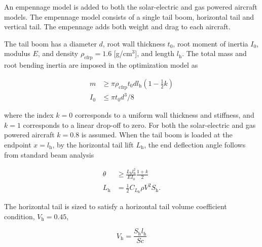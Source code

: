 An empennage model is added to both the solar-electric and gas powered aircraft models.  The empennage model consists of a single tail boom, horizontal tail and vertical tail.  
The empennage adds both weight and drag to each aircraft.  

The tail boom has a diameter $d$, root wall thickness $t_0$, root moment of inertia $I_0$, modulus $E$, and density $\rho_{\text{cfrp}} = 1.6$ [g/cm$^3$], and length $l_{\text{h}}$. 
The total mass and root bending inertia are imposed in the optimization model as 

\begin{align}
    m &\geq \pi \rho_{\text{cfrp}} t_0 d l_{\text{h}} \left( 1 - \frac{1}{2} k\right) \\
    I_0 &\leq \pi t_0 d^3/8
\end{align}

where the index $k=0$ corresponds to a uniform wall thickness and stiffness, and $k=1$ corresponds to a linear drop-off to zero.  For both the solar-electric and gas powered aircraft $k=0.8$ is assumed.  
When the tail boom is loaded at the endpoint $x=l_{\text{h}}$, by the horizontal tail lift $L_{\text{h}}$, the end deflection angle follows from standard beam analysis

\begin{align}
    \label{e:boomdefl}
    \theta &\geq \frac{L_{\text{h}} l_{\text{h}}^2}{EI_0} \frac{1+k}{2} \\
    L_{\text{h}} &= \frac{1}{2} C_{L_{\text{h}}} \rho V^2 S_{\text{h}}.
\end{align}

The horizontal tail is sized to satisfy a horizontal tail volume coefficient condition, $V_{\text{h}} = 0.45$,\cite{aircraftrules}

\begin{equation}
    V_{\text{h}} = \frac{S_{\text{h}}l_{\text{h}}}{Sc}
\end{equation}

